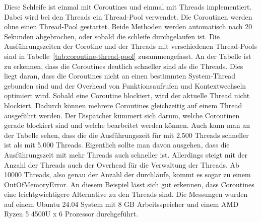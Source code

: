 \documentclass[11pt]{article}
\begin{document}
    Diese Schleife ist einmal mit Coroutines und einmal mit Threads implementiert.
    Dabei wird bei den Threads ein Thread-Pool verwendet.
    Die Coroutinen werden ohne einen Thread-Pool gestartet.
    Beide Methoden werden automatisch nach 20 Sekunden abgebrochen, oder sobald die schleife durchgelaufen ist.
    Die Ausführungszeiten der Corotine und der Threads mit verschiedenen Thread-Pools sind in Tabelle~\ref{tab:coroutine-thread-pool} zusammengefasst.
    An der Tabelle ist zu erkennen, dass die Coroutines deutlich schneller sind als die Threads.
    Dies liegt daran, dass die Coroutines nicht an einen bestimmten System-Thread gebunden sind und der Overhead von Funktionsaufrufen und Kontextwechseln optimiert wird.
    Sobald eine Coroutine blockiert, wird der aktuelle Thread nicht blockiert.
    Dadurch können mehrere Coroutines gleichzeitig auf einem Thread ausgeführt werden.
    Der Dispatcher kümmert sich darum, welche Coroutinen gerade blockiert sind und welche bearbeitet werden können.
    Auch kann man an der Tabelle sehen, dass die die Ausführungszeit für mit 2.500 Threads schneller ist als mit 5.000 Threads.
    Eigentlich sollte man davon ausgehen, dass die Ausführungszeit mit mehr Threads auch schneller ist.
    Allerdings steigt mit der Anzahl der Threads auch der Overhead für die Verwaltung der Threads.
    Ab 10000 Threads, also genau der Anzahl der durchläufe, kommt es sogar zu einem OutOfMemoryError.
    An diesem Beispiel lässt sich gut erkennen, dass Coroutines eine leichtgwichtigere Alternative zu den Threads sind.
    Die Messungen wurden auf einem Ubuntu 24.04 System mit 8 GB Arbeitsspeicher und einem AMD Ryzen 5 4500U x 6 Prozessor durchgeführt.\\
    \\
\end{document}
